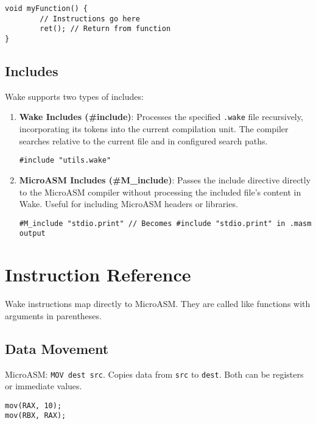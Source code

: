 \documentclass[a4paper,11pt]{book}
\begin{document}
\begin{lstlisting}[language=Wake,caption={Function definition}]
void myFunction() {
		// Instructions go here
		ret(); // Return from function
}
\end{lstlisting}

\subsection{Includes}
Wake supports two types of includes:

\begin{enumerate}[label=\arabic*.]
	\item \textbf{Wake Includes (\#include)}: Processes the specified \texttt{.wake} file recursively, incorporating its tokens into the current compilation unit. The compiler searches relative to the current file and in configured search paths.
\begin{lstlisting}[language=Wake]
#include "utils.wake"
\end{lstlisting}

	\item \textbf{MicroASM Includes (\#M\_include)}: Passes the include directive directly to the MicroASM compiler without processing the included file's content in Wake. Useful for including MicroASM headers or libraries.
\begin{lstlisting}[language=Wake]
#M_include "stdio.print" // Becomes #include "stdio.print" in .masm output
\end{lstlisting}
\end{enumerate}

\section{Instruction Reference}
Wake instructions map directly to MicroASM. They are called like functions with arguments in parentheses.

\subsection{Data Movement}
\begin{description}[style=nextline]
	\item[\texttt{mov(dest, src)}] MicroASM: \texttt{MOV dest src}. Copies data from \texttt{src} to \texttt{dest}. Both can be registers or immediate values.
\end{description}
\begin{lstlisting}[language=Wake]
mov(RAX, 10);
mov(RBX, RAX);
\end{lstlisting}
\end{document}
